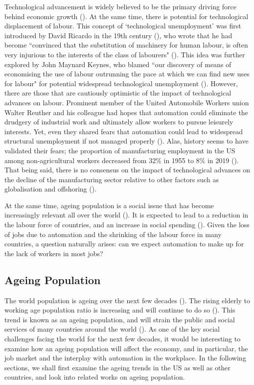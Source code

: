\documentclass[11pt]{article}
\begin{document}
Technological advancement is widely believed to be the primary driving force behind economic growth (\cite{RePEc:ssa:lembks:dosietal-1988}). At the same time, there is potential for technological displacement of labour. This concept of `technological unemployment' was first introduced by David Ricardo in the 19th century (\cite{WoirolGregoryR1997Ttua}), who wrote that he had become ``convinced that the substitution of machinery for human labour, is often very injurious to the interests of the class of labourers" (\cite{10.1257/jep.33.2.229}). This idea was further explored by John Maynard Keynes, who blamed ``our discovery of means of economising the use of labour outrunning the pace at which we can find new uses for labour" for potential widespread technological unemployment (\cite{Keynes2010}). However, there are those that are cautiously optimistic of the impact of technological advances on labour. Prominent member of the United Automobile Workers union Walter Reuther and his colleague had hopes that automation could eliminate the drudgery of industrial work and ultimately allow workers to pursue leisurely interests. Yet, even they shared fears that automation could lead to widespread structural unemployment if not managed properly (\cite{SteigerwaldDavid2010WRtU}). Alas, history seems to have validated their fears; the proportion of manufacturing employment in the US among non-agricultural workers decreased from 32\% in 1955 to 8\% in 2019 (\cite{rose_2021}). That being said, there is no consensus on the impact of technological advances on the decline of the manufacturing sector relative to other factors such as globalisation and offshoring (\cite{RoseElizabethL.2021TDoU,krugman2019globalization}).

At the same time, ageing population is a social issue that has become increasingly relevant all over the world (\cite{2002Wpa1}). It is expected to lead to a reduction in the labour force of countries, and an increase in social spending (\cite{marevsova2015economics}). Given the loss of jobs due to automation and the shrinking of the labour force in many countries, a question naturally arises: can we expect automation to make up for the lack of workers in most jobs?

\subsection{Ageing Population}
\label{subsec:ageingpopulation}

The world population is ageing over the next few decades (\cite{science}). The rising elderly to working age population ratio is increasing and will continue to do so (\cite{WHO}). This trend is known as an ageing population, and will strain the public and social services of many countries around the world (\cite{publicservicesstrain}). As one of the key social challenges facing the world for the next few decades, it would be interesting to examine how an ageing population will affect the economy, and in particular, the job market and the interplay with automation in the workplace. In the following sections, we shall first examine the ageing trends in the US as well as other countries, and look into related works on ageing population.
\end{document}

